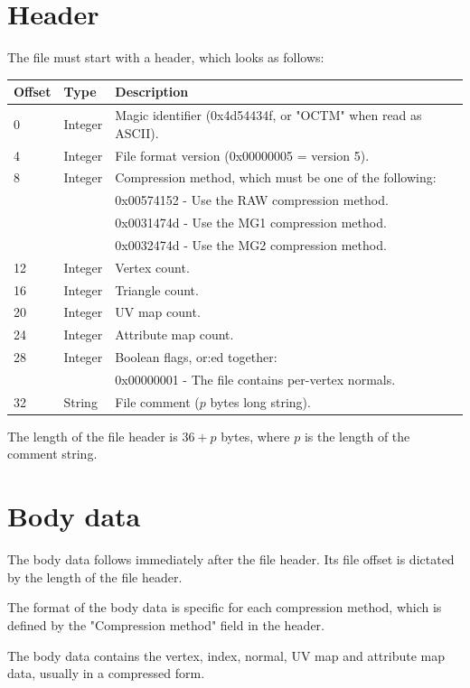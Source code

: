 \chapter{Header}
The file must start with a header, which looks as follows:

\begin{tabular}{|l|l|l|}\hline
\textbf{Offset} &  \textbf{Type} & \textbf{Description}\\ \hline
0 & Integer & Magic identifier (0x4d54434f, or "OCTM" when read as ASCII).\\ \hline
4 & Integer & File format version (0x00000005 = version 5).\\ \hline
8 & Integer & Compression method, which must be one of the following:\\
 & & 0x00574152 - Use the RAW compression method.\\
 & & 0x0031474d - Use the MG1 compression method.\\
 & & 0x0032474d - Use the MG2 compression method.\\ \hline
12 & Integer & Vertex count.\\ \hline
16 & Integer & Triangle count.\\ \hline
20 & Integer & UV map count.\\ \hline
24 & Integer & Attribute map count.\\ \hline
28 & Integer & Boolean flags, or:ed together:\\
 & & 0x00000001 - The file contains per-vertex normals.\\ \hline
32 & String & File comment ($p$ bytes long string).\\ \hline
\end{tabular}

The length of the file header is $36+p$ bytes, where $p$ is the length of the
comment string.



\chapter{Body data}
The body data follows immediately after the file header. Its file offset is
dictated by the length of the file header.

The format of the body data is specific for each compression method, which is
defined by the "Compression method" field in the header.

The body data contains the vertex, index, normal, UV map and attribute map
data, usually in a compressed form.


